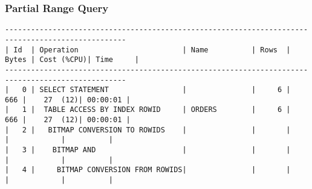 \documentclass[11pt,a4paper,parskip=half]{scrartcl}
\begin{document}
\subsubsection{Partial Range Query}
\begin{lstlisting}
--------------------------------------------------------------------------------------------------                                                                                                                                                                                                           
| Id  | Operation                        | Name          | Rows  | Bytes | Cost (%CPU)| Time     |                                                                                                                                                                                                           
--------------------------------------------------------------------------------------------------                                                                                                                                                                                                           
|   0 | SELECT STATEMENT                 |               |     6 |   666 |    27  (12)| 00:00:01 |                                                                                                                                                                                                           
|   1 |  TABLE ACCESS BY INDEX ROWID     | ORDERS        |     6 |   666 |    27  (12)| 00:00:01 |                                                                                                                                                                                                           
|   2 |   BITMAP CONVERSION TO ROWIDS    |               |       |       |            |          |                                                                                                                                                                                                           
|   3 |    BITMAP AND                    |               |       |       |            |          |                                                                                                                                                                                                           
|   4 |     BITMAP CONVERSION FROM ROWIDS|               |       |       |            |          |                                                                                                                                                                                                           

\end{lstlisting}
\end{document}
